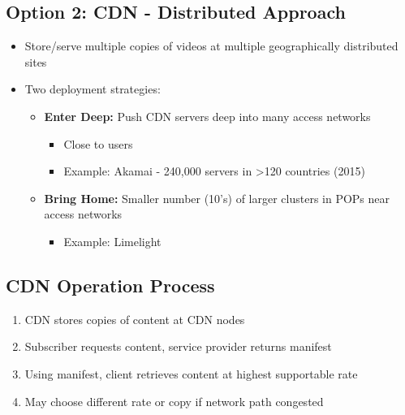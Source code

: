 \documentclass[12pt]{article}
\begin{document}
\subsection{Option 2: CDN - Distributed Approach}
\begin{itemize}
    \item Store/serve multiple copies of videos at multiple geographically distributed sites
    \item Two deployment strategies:

          \begin{itemize}
              \item \textbf{Enter Deep:} Push CDN servers deep into many access networks
                    \begin{itemize}
                        \item Close to users
                        \item Example: Akamai - 240,000 servers in >120 countries (2015)
                    \end{itemize}

              \item \textbf{Bring Home:} Smaller number (10's) of larger clusters in POPs near access networks
                    \begin{itemize}
                        \item Example: Limelight
                    \end{itemize}
          \end{itemize}
\end{itemize}

\subsection{CDN Operation Process}
\begin{enumerate}
    \item CDN stores copies of content at CDN nodes
    \item Subscriber requests content, service provider returns manifest
    \item Using manifest, client retrieves content at highest supportable rate
    \item May choose different rate or copy if network path congested
\end{enumerate}
\end{document}
